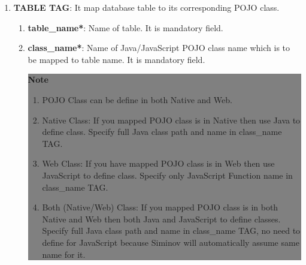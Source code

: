 \begin{enumerate}

	\item \small \textbf{TABLE TAG}: It map database table to its corresponding POJO class.

		\begin{enumerate}

			\item \small \textbf{table\_name*}: Name of table. It is mandatory field.
			\item \small \textbf{class\_name*}: Name of Java/JavaScript POJO class name which is to be mapped to table name. It is mandatory field.

	\begin{center}
		\colorbox{grey}{
			\parbox[t]{.8\linewidth}{
				\fontsize{11pt}{11pt}\selectfont %
				\vspace*{0.1cm} %
		
				\hfill \textbf{Note} \\

				\hfill 

				\begin{enumerate}

					\item \small POJO Class can be define in both Native and Web.
					
					\item \small Native Class: If you mapped POJO class is in Native then use Java to define class. Specify full Java class path and name in class\_name TAG.

					\item \small Web Class: If you have mapped POJO class is in Web then use JavaScript to define class. Specify only JavaScript Function name in class\_name TAG.

					\item \small Both (Native/Web) Class: If you mapped POJO class is in both Native and Web then both Java and JavaScript to define classes. Specify full Java class path and name in class\_name TAG, no need to define for JavaScript because Siminov will automatically assume same name for it.

	
				\end{enumerate}

				\vspace*{0.0cm} %
			}
		}


\end{center}
\end{enumerate}
\end{enumerate}
